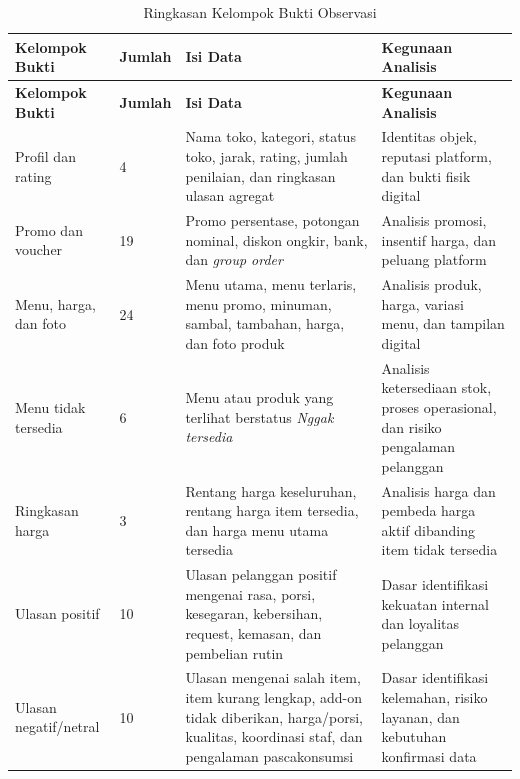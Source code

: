\begingroup
\footnotesize
\begin{xltabular}{\textwidth}{|Z{3.0cm}|C{1.2cm}|Y|Y|}
\caption{Ringkasan Kelompok Bukti Observasi}
\label{tab:ringkasan-kelompok-evidence-grabfood-20260613} \\
        \toprule
        \textbf{Kelompok Bukti} & \textbf{Jumlah} & \textbf{Isi Data} & \textbf{Kegunaan Analisis} \\ \hline
        \midrule
        \endfirsthead
        \toprule
        \textbf{Kelompok Bukti} & \textbf{Jumlah} & \textbf{Isi Data} & \textbf{Kegunaan Analisis} \\ \hline
        \midrule
        \endhead
        \endfoot
        \bottomrule
        \endlastfoot
        Profil dan rating & 4 & Nama toko, kategori, status toko, jarak, rating, jumlah penilaian, dan ringkasan ulasan agregat & Identitas objek, reputasi platform, dan bukti fisik digital \\ \hline
        Promo dan voucher & 19 & Promo persentase, potongan nominal, diskon ongkir, bank, dan \textit{group order} & Analisis promosi, insentif harga, dan peluang platform \\ \hline
        Menu, harga, dan foto & 24 & Menu utama, menu terlaris, menu promo, minuman, sambal, tambahan, harga, dan foto produk & Analisis produk, harga, variasi menu, dan tampilan digital \\ \hline
        Menu tidak tersedia & 6 & Menu atau produk yang terlihat berstatus \textit{Nggak tersedia} & Analisis ketersediaan stok, proses operasional, dan risiko pengalaman pelanggan \\ \hline
        Ringkasan harga & 3 & Rentang harga keseluruhan, rentang harga item tersedia, dan harga menu utama tersedia & Analisis harga dan pembeda harga aktif dibanding item tidak tersedia \\ \hline
        Ulasan positif & 10 & Ulasan pelanggan positif mengenai rasa, porsi, kesegaran, kebersihan, request, kemasan, dan pembelian rutin & Dasar identifikasi kekuatan internal dan loyalitas pelanggan \\ \hline
        Ulasan negatif/netral & 10 & Ulasan mengenai salah item, item kurang lengkap, add-on tidak diberikan, harga/porsi, kualitas, koordinasi staf, dan pengalaman pascakonsumsi & Dasar identifikasi kelemahan, risiko layanan, dan kebutuhan konfirmasi data \\ \hline
        \bottomrule
    
\end{xltabular}
\endgroup

